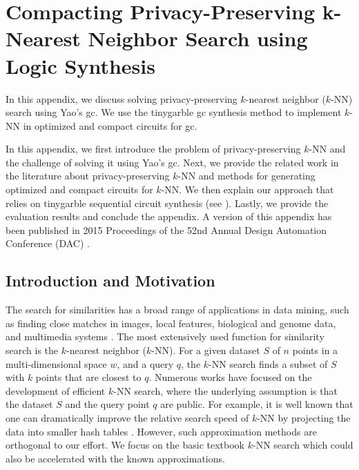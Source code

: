 \chapter{Compacting Privacy-Preserving k-Nearest Neighbor Search using Logic Synthesis}\label{chap:knn}
In this appendix, we discuss solving privacy-preserving $k$-nearest neighbor ($k$-NN) search using Yao's \acrfull{gc}.
We use the \gls{tinygarble} \acrshort{gc} synthesis method to implement $k$-NN in optimized and compact circuits for \acrshort{gc}.

In this appendix, we first introduce the problem of privacy-preserving $k$-NN and the challenge of solving it using Yao's \acrshort{gc}.
Next, we provide the related work in the literature about privacy-preserving $k$-NN and methods for generating optimized and compact circuits for $k$-NN.
We then explain our approach that relies on \gls{tinygarble} sequential circuit synthesis (see ).
Lastly, we provide the evaluation results and conclude the appendix.
A version of this appendix has been published in 2015 Proceedings of the 52nd Annual Design Automation Conference (DAC) \cite{songhori2015compacting}.

\section{Introduction and Motivation}\label{sec:knn-intro}
The search for similarities has a broad range of applications in data mining, such as finding close matches in images, local features, biological and genome data, and multimedia systems \cite{qi2008efficient}.
The most extensively used function for similarity search is the $k$-nearest neighbor ($k$-NN).
For a given dataset $S$ of $n$ points in a multi-dimensional space $w$, and a query $q$, the $k$-NN search finds a subset of $S$ with $k$ points that are closest to $q$.
Numerous works have focused on the development of efficient $k$-NN search, where the underlying assumption is that the dataset $S$ and the query point $q$ are public.
For example, it is well known that one can dramatically improve the relative search speed of $k$-NN by projecting the data into smaller hash tables \cite{andoni2006near,weiss2009spectral}.
However, such approximation methods are orthogonal to our effort.
We focus on the basic textbook $k$-NN search which could also be accelerated with the known approximations.

